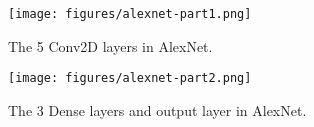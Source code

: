 \begin{figure}[H]
    \centering
    \texttt{[image: figures/alexnet-part1.png]}
    \caption{The 5 Conv2D layers in AlexNet.}
    \label{fig:alexnet-part1}
\end{figure}
\begin{figure}[H]
    \centering
    \texttt{[image: figures/alexnet-part2.png]}
    \caption{The 3 Dense layers and output layer in AlexNet.}
    \label{fig:alexnet-part2}
\end{figure}